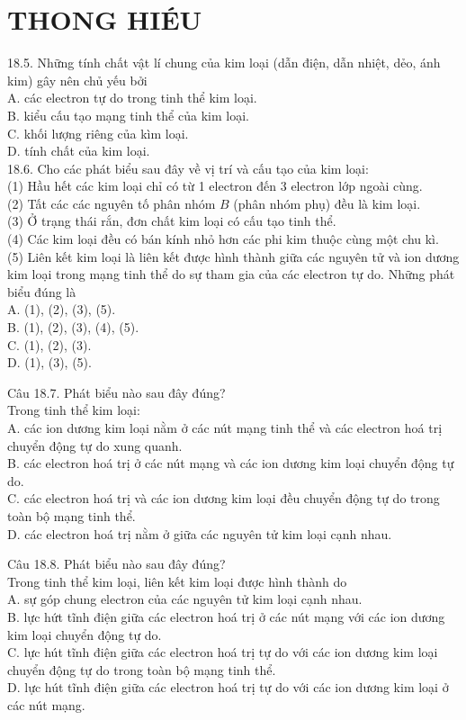 \documentclass[10pt]{article}
\begin{document}
\section*{THONG HIÉU}
18.5. Những tính chất vật lí chung của kim loại (dẫn điện, dẫn nhiệt, dẻo, ánh kim) gây nên chủ yếu bởi\\
A. các electron tự do trong tinh thể kim loại.\\
B. kiểu cấu tạo mạng tinh thể của kim loại.\\
C. khối lượng riêng của kìm loại.\\
D. tính chất của kim loại.\\
18.6. Cho các phát biểu sau đây về vị trí và cấu tạo của kim loại:\\
(1) Hầu hết các kim loại chỉ có từ 1 electron đến 3 electron lớp ngoài cùng.\\
(2) Tất các các nguyên tố phân nhóm $B$ (phân nhóm phụ) đều là kim loại.\\
(3) Ở trạng thái rắn, đơn chất kim loại có cấu tạo tinh thể.\\
(4) Các kim loại đều có bán kính nhỏ hơn các phi kim thuộc cùng một chu kì.\\
(5) Liên kết kim loại là liên kết được hình thành giữa các nguyên tử và ion dương kim loại trong mạng tinh thể do sự tham gia của các electron tự do. Những phát biểu đúng là\\
A. (1), (2), (3), (5).\\
B. (1), (2), (3), (4), (5).\\
C. (1), (2), (3).\\
D. (1), (3), (5).

Câu 18.7. Phát biểu nào sau đây đúng?\\
Trong tinh thể kim loại:\\
A. các ion dương kim loại nằm ở các nút mạng tinh thể và các electron hoá trị chuyển động tự do xung quanh.\\
B. các electron hoá trị ở các nút mạng và các ion dương kim loại chuyển động tự do.\\
C. các electron hoá trị và các ion dương kim loại đều chuyển động tự do trong toàn bộ mạng tinh thể.\\
D. các electron hoá trị nằm ở giữa các nguyên tử kim loại cạnh nhau.

Câu 18.8. Phát biểu nào sau đây đúng?\\
Trong tinh thể kim loại, liên kết kim loại được hình thành do\\
A. sự góp chung electron của các nguyên tử kim loại cạnh nhau.\\
B. lực hứt tĩnh điện giữa các electron hoá trị ở các nút mạng với các ion dương kim loại chuyển động tự do.\\
C. lực hút tĩnh điện giữa các electron hoá trị tự do với các ion dương kim loại chuyển động tự do trong toàn bộ mạng tinh thể.\\
D. lực hút tĩnh điện giữa các electron hoá trị tự do với các ion dương kim loại ở các nút mạng.
\end{document}
